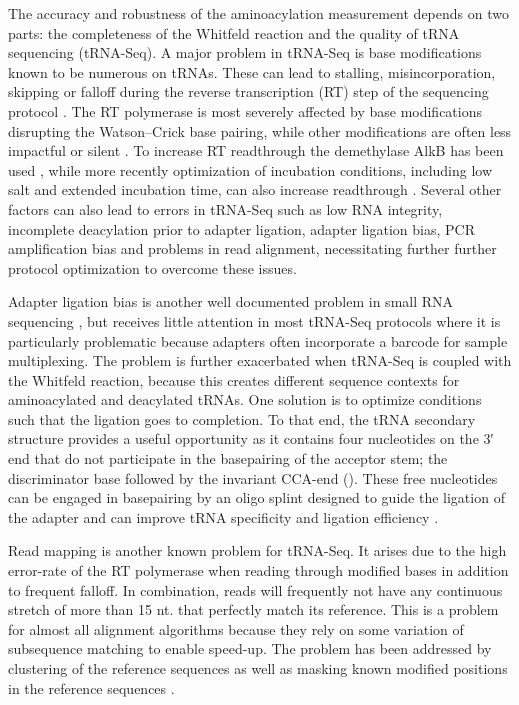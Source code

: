 \documentclass[9pt,lineno]{elife}
\begin{document}
The accuracy and robustness of the aminoacylation measurement depends on two parts: the completeness of the Whitfeld reaction and the quality of tRNA sequencing (tRNA-Seq).
A major problem in tRNA-Seq is base modifications known to be numerous on tRNAs.
These can lead to stalling, misincorporation, skipping or falloff during the reverse transcription (RT) step of the sequencing protocol \citep{Motorin2007-nb}.
The RT polymerase is most severely affected by base modifications disrupting the Watson–Crick base pairing, while other modifications are often less impactful or silent \citep{Wang2021-fc, Sas-Chen2019-um}.
To increase RT readthrough the demethylase AlkB has been used \citep{Zheng2015-kj, Cozen2015-cx}, while more recently optimization of incubation conditions, including low salt and extended incubation time, can also increase readthrough \citep{Behrens2021-gb}.
Several other factors can also lead to errors in tRNA-Seq such as low RNA integrity, incomplete deacylation prior to adapter ligation, adapter ligation bias, PCR amplification bias and problems in read alignment, necessitating further further protocol optimization to overcome these issues. 

Adapter ligation bias is another well documented problem in small RNA sequencing \citep{Fuchs2015-nb, Zhuang2012-nu}, but receives little attention in most tRNA-Seq protocols where it is particularly problematic because adapters often incorporate a barcode for sample multiplexing.
The problem is further exacerbated when tRNA-Seq is coupled with the Whitfeld reaction, because this creates different sequence contexts for aminoacylated and deacylated tRNAs.
One solution is to optimize conditions such that the ligation goes to completion.
To that end, the tRNA secondary structure provides a useful opportunity as it contains four nucleotides on the 3′ end that do not participate in the basepairing of the acceptor stem; the discriminator base followed by the invariant CCA-end ().
These free nucleotides can be engaged in basepairing by an oligo splint designed to guide the ligation of the adapter and can improve tRNA specificity and ligation efficiency \cite{Shigematsu2017-tv, Smith2015-ht}.

Read mapping is another known problem for tRNA-Seq.
It arises due to the high error-rate of the RT polymerase when reading through modified bases in addition to frequent falloff.
In combination, reads will frequently not have any continuous stretch of more than 15 nt. that perfectly match its reference.
This is a problem for almost all alignment algorithms because they rely on some variation of subsequence matching to enable speed-up.
The problem has been addressed by clustering of the reference sequences \citep{Hoffmann2018-uz} as well as masking known modified positions in the reference sequences \citep{Behrens2021-gb}.
\end{document}
